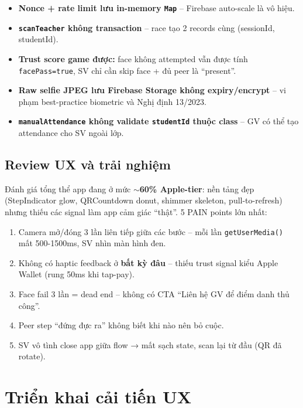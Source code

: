 \documentclass{article}
\begin{document}
\begin{itemize}[leftmargin=1.5em]
  \item \textbf{Nonce + rate limit lưu in-memory \texttt{Map}} -- Firebase auto-scale là vô hiệu.
  \item \textbf{\texttt{scanTeacher} không transaction} -- race tạo 2 records cùng (sessionId, studentId).
  \item \textbf{Trust score game được:} face không attempted vẫn được tính \texttt{facePass=true}, SV chỉ cần skip face + đủ peer là ``present''.
  \item \textbf{Raw selfie JPEG lưu Firebase Storage không expiry/encrypt} -- vi phạm best-practice biometric và Nghị định 13/2023.
  \item \textbf{\texttt{manualAttendance} không validate \texttt{studentId} thuộc class} -- GV có thể tạo attendance cho SV ngoài lớp.
\end{itemize}

\subsection{Review UX và trải nghiệm}

Đánh giá tổng thể app đang ở mức \textbf{$\sim$60\% Apple-tier}: nền tảng đẹp (StepIndicator glow, QRCountdown donut, shimmer skeleton, pull-to-refresh) nhưng thiếu các signal làm app cảm giác ``thật''. 5 PAIN points lớn nhất:

\begin{enumerate}[leftmargin=1.5em]
  \item Camera mở/đóng 3 lần liên tiếp giữa các bước -- mỗi lần \texttt{getUserMedia()} mất 500-1500ms, SV nhìn màn hình đen.
  \item Không có haptic feedback ở \textbf{bất kỳ đâu} -- thiếu trust signal kiểu Apple Wallet (rung 50ms khi tap-pay).
  \item Face fail 3 lần = dead end -- không có CTA ``Liên hệ GV để điểm danh thủ công''.
  \item Peer step ``đứng đực ra'' không biết khi nào nên bỏ cuộc.
  \item SV vô tình close app giữa flow → mất sạch state, scan lại từ đầu (QR đã rotate).
\end{enumerate}

\section{Triển khai cải tiến UX}
\end{document}
